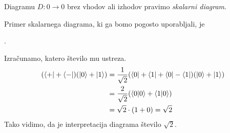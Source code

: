 \documentclass[mat1]{fmfdelo}
\begin{document}
\begin{definicija}
    Diagramu \(D:0\to0\) brez vhodov ali izhodov pravimo \emph{skalarni diagram}.
\end{definicija}
\begin{primer}\label{skal}
    Primer skalarnega diagrama, ki ga bomo pogosto uporabljali, je 
\begin{center}
    .
\end{center}
Izračunamo, katero število mu ustreza.
\begin{align*}
    (\bra{+}+\bra{-})(\ket0 + \ket 1)&=
    \frac{1}{\sqrt2}(\bra{0}+\bra{1}+\bra0-\bra1)(\ket0 + \ket 1)\\
    &=\frac{2}{\sqrt2}(\braket{0}{0}+\braket{1}{0})\\
    &=\sqrt{2}\cdot (1 + 0) = \sqrt2
\end{align*}
Tako vidimo, da je interpretacija diagrama število \(\sqrt{2}\).
\end{primer}
\end{document}
